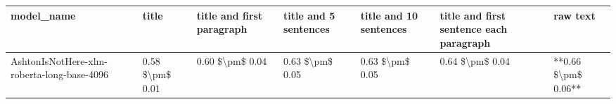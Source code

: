 \begin{tabular}{lllllll}
\toprule
                                model\_name &           title & title and first paragraph & title and 5 sentences & title and 10 sentences & title and first sentence each paragraph &            raw text \\
\midrule
AshtonIsNotHere-xlm-roberta-long-base-4096 & 0.58 \$\textbackslash pm\$ 0.01 &           0.60 \$\textbackslash pm\$ 0.04 &       0.63 \$\textbackslash pm\$ 0.05 &        0.63 \$\textbackslash pm\$ 0.05 &                         0.64 \$\textbackslash pm\$ 0.04 & **0.66 \$\textbackslash pm\$ 0.06** \\
\bottomrule
\end{tabular}
